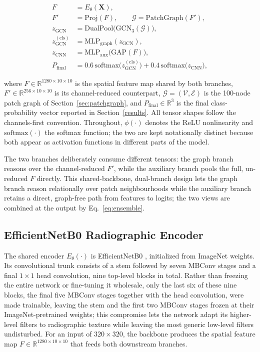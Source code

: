 \documentclass[journal]{IEEEtran}
\begin{document}
\begingroup
\small
\begin{equation}
\label{eq:forward}
\begin{aligned}
F &= E_{\theta}(\mathbf{X}), \\
F' &= \mathrm{Proj}(F), \qquad \mathcal{G} = \mathrm{PatchGraph}(F'), \\
z_{\text{GCN}} &= \mathrm{DualPool}\big(\mathrm{GCN}_3(\mathcal{G})\big), \\
z_{\text{GCN}}^{(\text{cls})} &= \mathrm{MLP}_{\text{graph}}(z_{\text{GCN}}), \\
z_{\text{CNN}} &= \mathrm{MLP}_{\text{aux}}\big(\mathrm{GAP}(F)\big), \\
P_{\text{final}} &= 0.6\,\mathrm{softmax}\big(z_{\text{GCN}}^{(\text{cls})}\big)
+ 0.4\,\mathrm{softmax}\big(z_{\text{CNN}}\big),
\end{aligned}
\end{equation}
\endgroup

where $F \in \mathbb{R}^{1280\times10\times10}$ is the spatial feature map shared
by both branches, $F' \in \mathbb{R}^{256\times10\times10}$ is its
channel-reduced counterpart, $\mathcal{G}=(\mathcal{V},\mathcal{E})$ is the
100-node patch graph of Section~\ref{sec:patchgraph}, and
$P_{\text{final}} \in \mathbb{R}^{3}$ is the final class-probability vector
reported in Section~\ref{results}. All tensor shapes follow the
channels-first convention. Throughout, $\phi(\cdot)$ denotes the ReLU
nonlinearity and $\mathrm{softmax}(\cdot)$ the softmax function; the two are
kept notationally distinct because both appear as activation functions in
different parts of the model.

The two branches deliberately consume different tensors: the graph branch
reasons over the channel-reduced $F'$, while the auxiliary branch pools the
full, un-reduced $F$ directly. This shared-backbone, dual-branch design lets the
graph branch reason relationally over patch neighbourhoods while the auxiliary
branch retains a direct, graph-free path from features to logits; the two views
are combined at the output by Eq.~\eqref{eq:ensemble}.

\subsection{EfficientNetB0 Radiographic Encoder}
\label{sec:encoder}
The shared encoder $E_{\theta}(\cdot)$ is EfficientNetB0
\cite{tan2019efficientnet}, initialized from ImageNet weights. Its convolutional
trunk consists of a stem followed by seven MBConv stages and a final
$1\times1$ head convolution, nine top-level blocks in total. Rather than
freezing the entire network or fine-tuning it wholesale, only the last six of
these nine blocks, the final five MBConv stages together with the head
convolution, were made trainable, leaving the stem and the first two MBConv
stages frozen at their ImageNet-pretrained weights; this compromise lets the
network adapt its higher-level filters to radiographic texture while leaving the
most generic low-level filters undisturbed. For an input of $320 \times 320$,
the backbone produces the spatial feature map
$F \in \mathbb{R}^{1280\times10\times10}$ that feeds both downstream branches.
\end{document}
